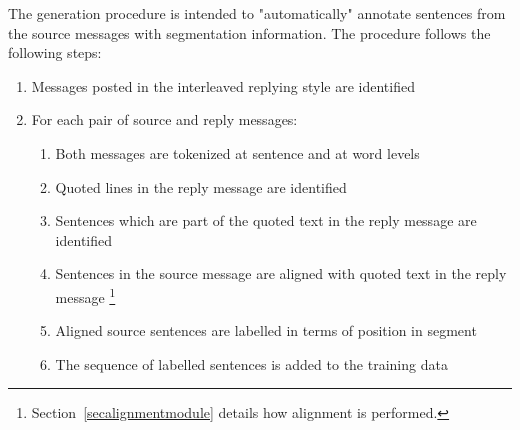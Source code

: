 


The generation procedure is intended to "automatically" annotate sentences from the source messages with segmentation information.
The procedure follows the following steps:
\begin{enumerate}[itemsep=0mm]
\item Messages posted in the interleaved replying style are identified
\item For each pair of source and reply messages:
\begin{enumerate}
\item Both messages are tokenized at sentence and at word levels
\item Quoted lines in the reply message are identified
\item Sentences which are part of the quoted text in the reply message are identified 
\item Sentences in the source message are aligned with  quoted text in the reply message \footnote{Section~\ref{secalignmentmodule} details how alignment is performed.}
\item Aligned source sentences are labelled in terms of position in segment %
\item The sequence of labelled sentences is added to the training data %
\end{enumerate}
\end{enumerate}

